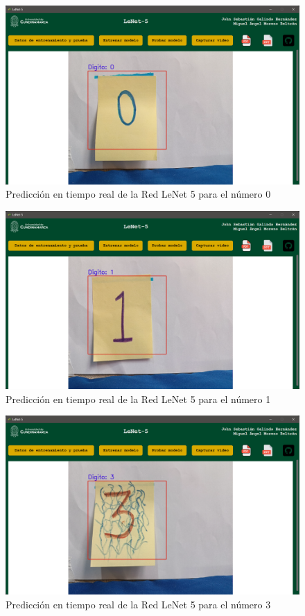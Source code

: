 \begin{figure}[H]
    \centering
    \includegraphics[width=\linewidth]{src/figures/real_test_image_0.png}
    \caption{Predicción en tiempo real de la Red LeNet 5 para el número 0}
    \label{fig:RealTest_0}
\end{figure}

\begin{figure}[H]
    \centering
    \includegraphics[width=\linewidth]{src/figures/real_test_image_1.png}
    \caption{Predicción en tiempo real de la Red LeNet 5 para el número 1}
    \label{fig:RealTest_1}
\end{figure}

\begin{figure}[H]
    \centering
    \includegraphics[width=\linewidth]{src/figures/real_test_image_3.png}
    \caption{Predicción en tiempo real de la Red LeNet 5 para el número 3}
    \label{fig:RealTest_3}
\end{figure}

